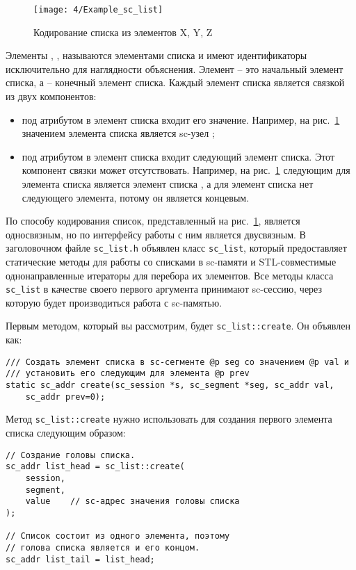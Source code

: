 \begin{figure}
  \centering
  \texttt{[image: 4/Example\_sc\_list]}
  \caption{Кодирование списка из элементов X, Y, Z}
  \label{fig:Example_sc_list}
\end{figure}


Элементы , ,  называются элементами списка
и имеют идентификаторы исключительно для наглядности
объяснения. Элемент  – это начальный элемент списка, а
 – конечный элемент списка. Каждый элемент списка является
связкой из двух компонентов:
\begin{itemize}
\item под атрибутом  в элемент списка входит его
  значение. Например, на рис.~\ref{fig:Example_sc_list} значением
  элемента списка  является sc-узел ;
\item под атрибутом  в элемент списка входит
  следующий элемент списка. Этот компонент связки может
  отсутствовать. Например, на рис.~\ref{fig:Example_sc_list} следующим
  для элемента списка  является элемент списка , а
  для элемент списка  нет следующего элемента, потому он
  является концевым.
\end{itemize}

По способу кодирования список, представленный на
рис.~\ref{fig:Example_sc_list}, является односвязным, но по интерфейсу
работы с ним является двусвязным. В заголовочном файле
\verb|sc_list.h| объявлен класс \lstinline|sc_list|, который
предоставляет статические методы для работы со списками в sc-памяти и
STL-совместимые однонаправленные итераторы для перебора их
элементов. Все методы класса \lstinline|sc_list| в качестве своего
первого аргумента принимают sc-сессию, через которую будет
производиться работа с sc-памятью.

Первым методом, который вы рассмотрим, будет
\lstinline|sc_list::create|. Он объявлен как:
\begin{lstlisting}[texcl]
/// Создать элемент списка в sc-сегменте @p seg со значением @p val и
/// установить его следующим для элемента @p prev
static sc_addr create(sc_session *s, sc_segment *seg, sc_addr val,
    sc_addr prev=0);
\end{lstlisting}

Метод \lstinline|sc_list::create| нужно использовать для создания
первого элемента списка следующим образом:
\begin{lstlisting}[texcl]
// Создание головы списка.
sc_addr list_head = sc_list::create(
    session,
    segment,
    value    // sc-адрес значения головы списка
);

// Список состоит из одного элемента, поэтому
// голова списка является и его концом.
sc_addr list_tail = list_head;
\end{lstlisting}

